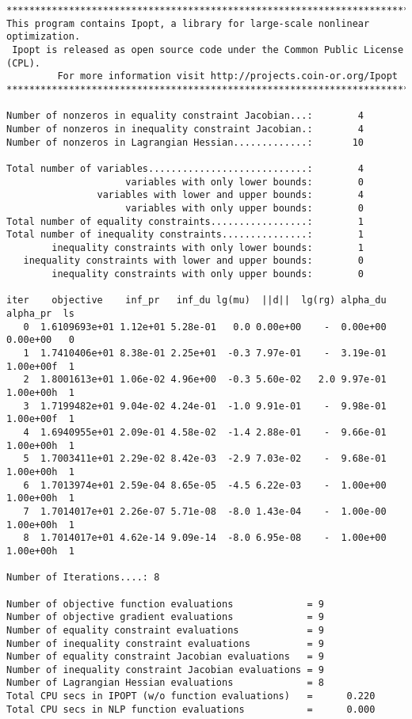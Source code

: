 \documentclass[10pt]{article}
\begin{document}
\begin{footnotesize}
\begin{verbatim}
******************************************************************************
This program contains Ipopt, a library for large-scale nonlinear optimization.
 Ipopt is released as open source code under the Common Public License (CPL).
         For more information visit http://projects.coin-or.org/Ipopt
******************************************************************************

Number of nonzeros in equality constraint Jacobian...:        4
Number of nonzeros in inequality constraint Jacobian.:        4
Number of nonzeros in Lagrangian Hessian.............:       10

Total number of variables............................:        4
                     variables with only lower bounds:        0
                variables with lower and upper bounds:        4
                     variables with only upper bounds:        0
Total number of equality constraints.................:        1
Total number of inequality constraints...............:        1
        inequality constraints with only lower bounds:        1
   inequality constraints with lower and upper bounds:        0
        inequality constraints with only upper bounds:        0

iter    objective    inf_pr   inf_du lg(mu)  ||d||  lg(rg) alpha_du alpha_pr  ls
   0  1.6109693e+01 1.12e+01 5.28e-01   0.0 0.00e+00    -  0.00e+00 0.00e+00   0
   1  1.7410406e+01 8.38e-01 2.25e+01  -0.3 7.97e-01    -  3.19e-01 1.00e+00f  1
   2  1.8001613e+01 1.06e-02 4.96e+00  -0.3 5.60e-02   2.0 9.97e-01 1.00e+00h  1
   3  1.7199482e+01 9.04e-02 4.24e-01  -1.0 9.91e-01    -  9.98e-01 1.00e+00f  1
   4  1.6940955e+01 2.09e-01 4.58e-02  -1.4 2.88e-01    -  9.66e-01 1.00e+00h  1
   5  1.7003411e+01 2.29e-02 8.42e-03  -2.9 7.03e-02    -  9.68e-01 1.00e+00h  1
   6  1.7013974e+01 2.59e-04 8.65e-05  -4.5 6.22e-03    -  1.00e+00 1.00e+00h  1
   7  1.7014017e+01 2.26e-07 5.71e-08  -8.0 1.43e-04    -  1.00e-00 1.00e+00h  1
   8  1.7014017e+01 4.62e-14 9.09e-14  -8.0 6.95e-08    -  1.00e+00 1.00e+00h  1

Number of Iterations....: 8

Number of objective function evaluations             = 9
Number of objective gradient evaluations             = 9
Number of equality constraint evaluations            = 9
Number of inequality constraint evaluations          = 9
Number of equality constraint Jacobian evaluations   = 9
Number of inequality constraint Jacobian evaluations = 9
Number of Lagrangian Hessian evaluations             = 8
Total CPU secs in IPOPT (w/o function evaluations)   =      0.220
Total CPU secs in NLP function evaluations           =      0.000


\end{verbatim}
\end{footnotesize}
\end{document}
